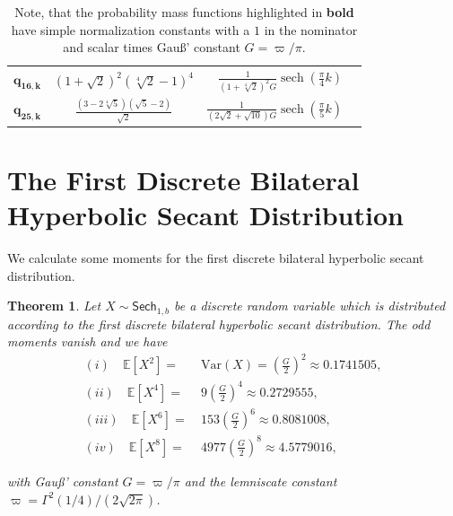 \documentclass[12pt]{amsart}
\newtheorem{theorem}{Theorem}[section]
\theoremstyle{definition}
\theoremstyle{remark}
\numberwithin{equation}{section}
\newcommand{\1}{\mathbbm{1}}
\begin{document}
\begin{table}[t]
\begin{tabular}{c|c|r}
$\mathbf{q_{16,k}}$  & $\left(1 + \sqrt{2}\right)^2 \left(\sqrt[4]{2} - 1\right)^4$ & $\frac{1}{\left(1 + \sqrt[4]{2} \right)^2 G} \operatorname{sech} \left(\frac{\pi}{4} k\right)\quad$\\
$\mathbf{q_{25,k}}$  & $\frac{\left(3 - 2 \sqrt[4]{5}\right)\left(\sqrt{5} - 2\right)}{\sqrt{2}}$ & $\frac{1}{\left(2\sqrt{2} + \sqrt{10} \right) G} \operatorname{sech} \left(\frac{\pi}{5} k\right) \quad$
\end{tabular}
    \caption{Note, that the probability mass functions highlighted in \textbf{bold} have simple normalization constants with a $1$ in the nominator and scalar times  Gau\ss' constant $G=\varpi/\pi$.}
    \label{tab:sqrt_r_sech}
\end{table}

\vspace{3cm}

\section{The First Discrete Bilateral Hyperbolic Secant Distribution}

We calculate some moments for the first discrete bilateral hyperbolic secant distribution.

\begin{theorem} \label{thm_Var_1_b}
Let $X\sim\mathsf{Sech}_{1,b}$ be a discrete random variable which is distributed according to the first discrete bilateral hyperbolic secant distribution. The odd moments vanish and we have
\begin{align*}    
(i) \quad \mathbb{E}\left[X^2 \right] =&\ \mathrm{Var}(X) = \left(\frac{G}{2}\right)^2 \approx 0.1741505,\\
(ii) \quad \mathbb{E}\left[X^4 \right] =&\ 9\left(\frac{G}{2}\right)^4 \approx 0.2729555,\\
(iii) \quad \mathbb{E}\left[X^6 \right] =&\ 153\left(\frac{G}{2}\right)^6 \approx 0.8081008,\\
(iv) \quad \mathbb{E}\left[X^8 \right] =&\ 4977\left(\frac{G}{2}\right)^8 \approx 4.5779016,
\end{align*}

with Gau\ss' constant $G = \varpi/\pi$ and the lemniscate constant $\varpi = \Gamma^2(1/4)/(2\sqrt{2\pi})$.
\end{theorem}
\end{document}
